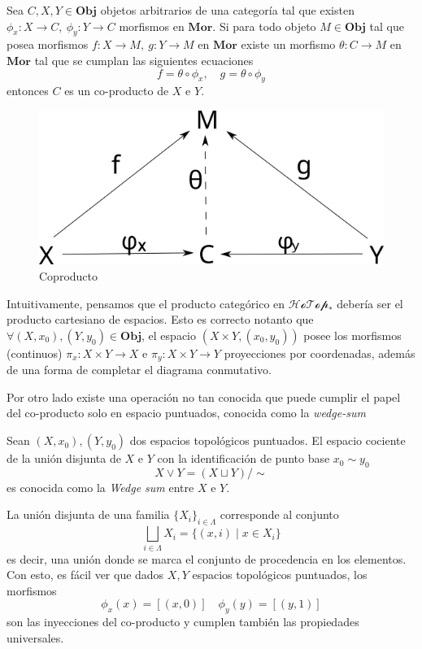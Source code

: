 \begin{definicion}[Coproducto] \label{def:coproducto}
  Sea \(C , X , Y \in \mathbf {Obj}\) objetos arbitrarios de una categoría
  tal que existen \(\phi_x : X \to C,\ \phi_y : Y \to C\) morfismos en
  \(\mathbf {Mor}\). Si para todo objeto \(M \in \mathbf {Obj}\) tal que posea
  morfismos \( f : X \to M,\ g : Y \to M\) en \(\mathbf{Mor}\) existe un
  morfismo \(\theta : C \to M\) en \(\mathbf{Mor}\) tal que se cumplan
  las siguientes ecuaciones
  \[ f = \theta \circ \phi_x, \quad g = \theta \circ \phi_y \]
  entonces \(C\) es un co-producto de \(X\) e \(Y\).
  \begin{figure}[h]
    \centering
    \includegraphics[scale=0.5]{./imagenes/coproducto.png}
    \caption{Coproducto}
  \end{figure}
\end{definicion}
Intuitivamente, pensamos que el producto categórico en
\(\mathscr{HoTop}_*\) debería ser el producto cartesiano de espacios.
Esto es correcto notanto que \(\forall (X,x_0) , (Y, y_0) \in \mathbf
{Obj} \), el espacio \((X \times Y, (x_0, y_0))\) posee los morfismos
(continuos) \(\pi_x : X \times Y \to X \) e \(\pi_y : X \times Y \to Y
\) proyecciones por coordenadas, además de una forma de completar el
diagrama conmutativo.

Por otro lado existe una operación no tan conocida que puede cumplir el papel
del co-producto solo en espacio puntuados, conocida como la \emph{wedge-sum}
\begin{definicion}
  Sean \((X, x_0),(Y, y_0)\) dos espacios topológicos puntuados. El
  espacio cociente de la unión disjunta\cite[p.~2]{Martin} de \(X\) e
  \(Y\) con la identificación de punto base \(x_0 \sim y_0\)
  \[ X \vee Y = (X \sqcup Y) / \sim \]
  es conocida como la \emph{Wedge sum} entre \(X\) e \(Y\).
\end{definicion}
La unión disjunta de una familia \(\{X_i\}_{i \in \Lambda}\) corresponde
al conjunto
\[ \bigsqcup_{i \in \Lambda} X_i = \{ (x, i) \mid x \in X_i \} \]
es decir, una unión donde se marca el conjunto de procedencia en los
elementos. Con esto, es fácil ver que dados \(X, Y\) espacios topológicos
puntuados, los morfismos
\[ \phi_x (x) = [(x,0)] \quad \phi_y (y) = [(y,1)] \]
son las inyecciones del co-producto y cumplen también las propiedades
universales.


